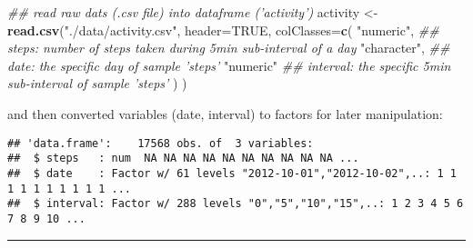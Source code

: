 \documentclass[]{article}
\newenvironment{Shaded}{\begin{snugshade}}{\end{snugshade}}
\newcommand{\CommentTok}[1]{\textcolor[rgb]{0.56,0.35,0.01}{\textit{#1}}}
\newcommand{\DataTypeTok}[1]{\textcolor[rgb]{0.13,0.29,0.53}{#1}}
\newcommand{\KeywordTok}[1]{\textcolor[rgb]{0.13,0.29,0.53}{\textbf{#1}}}
\newcommand{\NormalTok}[1]{#1}
\newcommand{\OperatorTok}[1]{\textcolor[rgb]{0.81,0.36,0.00}{\textbf{#1}}}
\newcommand{\OtherTok}[1]{\textcolor[rgb]{0.56,0.35,0.01}{#1}}
\newcommand{\StringTok}[1]{\textcolor[rgb]{0.31,0.60,0.02}{#1}}
\begin{document}
\begin{Shaded}
\begin{Highlighting}[]
\CommentTok{## read raw dats (.csv file) into dataframe ('activity')}
\NormalTok{activity <-}\StringTok{ }\KeywordTok{read.csv}\NormalTok{(}\StringTok{"./data/activity.csv"}\NormalTok{,}
                     \DataTypeTok{header=}\OtherTok{TRUE}\NormalTok{, }
                     \DataTypeTok{colClasses=}\KeywordTok{c}\NormalTok{(}
                             \StringTok{"numeric"}\NormalTok{,   }\CommentTok{## steps: number of steps taken during 5min sub-interval of a day}
                             \StringTok{"character"}\NormalTok{, }\CommentTok{## date: the specific day of sample 'steps'}
                             \StringTok{"numeric"}    \CommentTok{## interval: the specific 5min sub-interval of sample 'steps'}
\NormalTok{                     )}
\NormalTok{)}
\end{Highlighting}
\end{Shaded}

and then converted variables (date, interval) to factors for later
manipulation:

\begin{Shaded}
\end{Shaded}

\begin{verbatim}
## 'data.frame':    17568 obs. of  3 variables:
##  $ steps   : num  NA NA NA NA NA NA NA NA NA NA ...
##  $ date    : Factor w/ 61 levels "2012-10-01","2012-10-02",..: 1 1 1 1 1 1 1 1 1 1 ...
##  $ interval: Factor w/ 288 levels "0","5","10","15",..: 1 2 3 4 5 6 7 8 9 10 ...
\end{verbatim}

\begin{center}\rule{0.5\linewidth}{\linethickness}\end{center}
\end{document}
